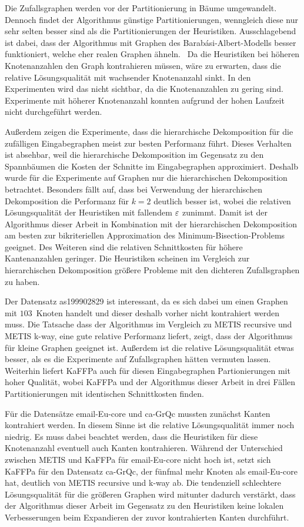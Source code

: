Die Zufallsgraphen werden vor der Partitionierung in Bäume umgewandelt. 
Dennoch findet der Algorithmus günstige Partitionierungen, wenngleich diese nur sehr selten besser sind als die Partitionierungen der Heuristiken.
Ausschlagebend ist dabei, dass der Algorithmus mit Graphen des Barabási-Albert-Modells besser funktioniert, welche eher realen Graphen ähneln.~\cite{AB02}
Da die Heuristiken bei höheren Knotenanzahlen den Graph kontrahieren müssen, wäre zu erwarten, dass die relative Lösungsqualität mit wachsender Knotenanzahl sinkt.
In den Experimenten wird das nicht sichtbar, da die Knotenanzahlen zu gering sind.
Experimente mit höherer Knotenanzahl konnten aufgrund der hohen Laufzeit nicht durchgeführt werden.

Außerdem zeigen die Experimente, dass die hierarchische Dekomposition für die zufälligen Eingabegraphen meist zur besten Performanz führt.
Dieses Verhalten ist absehbar, weil die hierarchische Dekomposition im Gegensatz zu den Spannbäumen die Kosten der Schnitte im Eingabegraphen approximiert.
Deshalb wurde für die Experimente auf Graphen nur die hierarchischen Dekomposition betrachtet.
Besonders fällt auf, dass bei Verwendung der hierarchischen Dekomposition die Performanz für $k=2$ deutlich besser ist, wobei die relativen Lösungsqualität der Heuristiken mit fallendem $\varepsilon$ zunimmt.
Damit ist der Algorithmus dieser Arbeit in Kombination mit der hierarchischen Dekomposition am besten zur bikriteriellen Approximation des Minimum-Bisection-Problems geeignet.
Des Weiteren sind die relativen Schnittkosten für höhere Kantenanzahlen geringer.
Die Heuristiken scheinen im Vergleich zur hierarchischen Dekomposition größere Probleme mit den dichteren Zufallsgraphen zu haben.

Der Datensatz as199902829 ist interessant, da es sich dabei um einen Graphen mit $103$~Knoten handelt und dieser deshalb vorher nicht kontrahiert werden muss.
Die Tatsache dass der Algorithmus im Vergleich zu METIS recursive und METIS k-way, eine gute relative Performanz liefert, zeigt, dass der Algorithmus für kleine Graphen geeignet ist.
Außerdem ist die relative Lösungsqualität etwas besser, als es die Experimente auf Zufallsgraphen hätten vermuten lassen.
Weiterhin liefert KaFFPa auch für diesen Eingabegraphen Partionierungen mit hoher Qualität, wobei KaFFPa und der Algorithmus dieser Arbeit in drei Fällen Partitionierungen mit identischen Schnittkosten finden.

Für die Datensätze email-Eu-core und ca-GrQc mussten zunächst Kanten kontrahiert werden.
In diesem Sinne ist die relative Lösungsqualität immer noch niedrig.
Es muss dabei beachtet werden, dass die Heuristiken für diese Knotenanzahl eventuell auch Kanten kontrahieren.
Während der Unterschied zwischen METIS und KaFFPa für email-Eu-core nicht hoch ist, setzt sich KaFFPa für den Datensatz ca-GrQc, der fünfmal mehr Knoten als email-Eu-core hat, deutlich von METIS recursive und k-way ab.
Die tendenziell schlechtere Lösungsqualität für die größeren Graphen wird mitunter dadurch verstärkt, dass der Algorithmus dieser Arbeit im Gegensatz zu den Heuristiken keine lokalen Verbesserungen beim Expandieren der zuvor kontrahierten Kanten durchführt.

